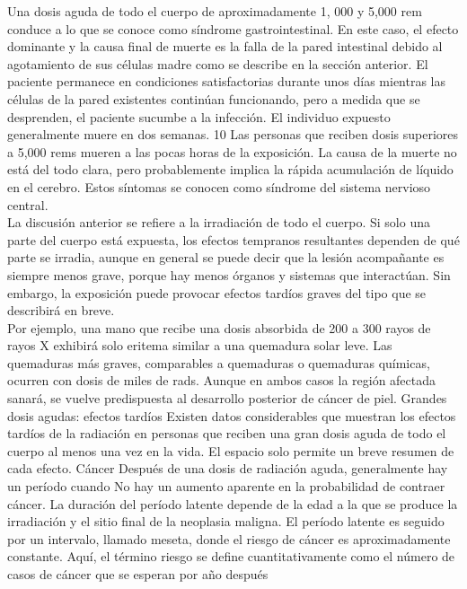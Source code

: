 \documentclass[]{article}
\begin{document}
Una dosis aguda de todo el cuerpo de aproximadamente 1, 000 y 5,000 rem conduce a lo que se conoce como síndrome gastrointestinal. En este caso, el efecto dominante y la causa final de muerte es la falla de la pared intestinal debido al agotamiento de sus células madre como se describe en la sección anterior.
El paciente permanece en condiciones satisfactorias durante unos días mientras las células de la pared existentes continúan funcionando, pero a medida que se desprenden, el paciente sucumbe a la infección. El individuo expuesto generalmente muere en dos semanas. 10 Las personas que reciben dosis superiores a 5,000 rems mueren a las pocas horas de la exposición. La causa de la muerte no está del todo clara, pero probablemente implica la rápida acumulación de líquido en el cerebro. Estos síntomas se conocen como síndrome del sistema nervioso central.\\

La discusión anterior se refiere a la irradiación de todo el cuerpo. Si solo una parte del cuerpo está expuesta, los efectos tempranos resultantes dependen de qué parte se irradia, aunque en general se puede decir que la lesión acompañante es siempre menos grave, porque hay menos órganos y sistemas que interactúan. Sin embargo, la exposición puede provocar efectos tardíos graves del tipo que se describirá en breve.\\

Por ejemplo, una mano que recibe una dosis absorbida de 200 a 300 rayos de rayos X exhibirá solo eritema similar a una quemadura solar leve. Las quemaduras más graves, comparables a quemaduras o quemaduras químicas, ocurren con dosis de miles de rads. Aunque en ambos casos la región afectada sanará, se vuelve predispuesta al desarrollo posterior de cáncer de piel.
Grandes dosis agudas: efectos tardíos
Existen datos considerables que muestran los efectos tardíos de la radiación en personas que reciben una gran dosis aguda de todo el cuerpo al menos una vez en la vida. El espacio solo permite un breve resumen de cada efecto.
Cáncer Después de una dosis de radiación aguda, generalmente hay un período cuando
No hay un aumento aparente en la probabilidad de contraer cáncer. La duración del período latente depende de la edad a la que se produce la irradiación y el sitio final de la neoplasia maligna. El período latente es seguido por un intervalo, llamado meseta, donde el riesgo de cáncer es aproximadamente constante. Aquí, el término riesgo se define cuantitativamente como el número de casos de cáncer que se esperan por año después\\
\end{document}
